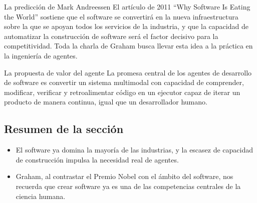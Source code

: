 \begin{knowledgebox}{La predicción de Mark Andreessen}
El artículo de 2011 ``Why Software Is Eating the World'' sostiene que el software se convertirá en la nueva infraestructura sobre la que se apoyan todos los servicios de la industria, y que la capacidad de automatizar la construcción de software será el factor decisivo para la competitividad. Toda la charla de Graham busca llevar esta idea a la práctica en la ingeniería de agentes.
\end{knowledgebox}

\begin{importantbox}{La propuesta de valor del agente}
La promesa central de los agentes de desarrollo de software es convertir un sistema multimodal con capacidad de comprender, modificar, verificar y retroalimentar código en un ejecutor capaz de iterar un producto de manera continua, igual que un desarrollador humano.
\end{importantbox}

\subsection{Resumen de la sección}
\begin{itemize}
    \item El software ya domina la mayoría de las industrias, y la escasez de capacidad de construcción impulsa la necesidad real de agentes.
    \item Graham, al contrastar el Premio Nobel con el ámbito del software, nos recuerda que crear software ya es una de las competencias centrales de la ciencia humana.
\end{itemize}

